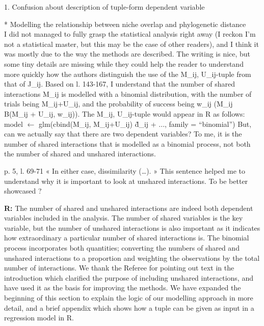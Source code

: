 \documentclass[12pt]{letter}
\newenvironment{refquote}{\bigskip \begin{it}}{\end{it}\smallskip}
\begin{document}
	1. Confusion about description of tuple-form dependent variable

		\begin{refquote}
			* Modelling the relationship between niche overlap and phylogenetic distance\\
			I did not managed to fully grasp the statistical analysis right away (I reckon I'm not a statistical master, but this may be the case of other readers), and I think it was mostly due to the way the methods are described. The writing is nice, but some tiny details are missing while they could help the reader to understand more quickly how the authors distinguish the use of the {M\_ij, U\_ij}-tuple from that of J\_ij.
			Based on l. 143-167, I understand that the number of shared interactions M\_ij is modelled with a binomial distribution, with the number of trials being M\_ij+U\_ij, and the probability of success being w\_ij (M\_ij ~ B(M\_ij + U\_ij, w\_ij)). The {M\_ij, U\_ij}-tuple would appear in R as follows:
			model $\leftarrow$ glm(cbind(M\_ij, M\_ij+U\_ij) \~ d\_ij + ..., family = “binomial”)
			But, can we actually say that there are two dependent variables? To me, it is the number of shared interactions that is modelled as a binomial process, not both the number of shared and unshared interactions.

			\smallskip

			p. 5, l. 69-71 « In either case, dissimilarity (…). » This sentence helped me to understand why it is important to look at unshared interactions. To be better showcased ?

		\end{refquote}


		\textbf{R:} The number of shared and unshared interactions are indeed both dependent variables included in the analysis. The number of shared variables is the key variable, but the number of unshared interactions is also important as it indicates how extraordinary a particular number of shared interactions is. The binomial process incorporates both quantities; converting the numbers of shared and unshared interactions to a proportion and weighting the observations by the total number of interactions. We thank the Referee for pointing out text in the introduction which clarified the purpose of including unshared interactions, and have used it as the basis for improving the methods. We have expanded the beginning of this section to explain the logic of our modelling approach in more detail, and a brief appendix which shows how a tuple can be given as input in a regression model in R.
\end{document}
